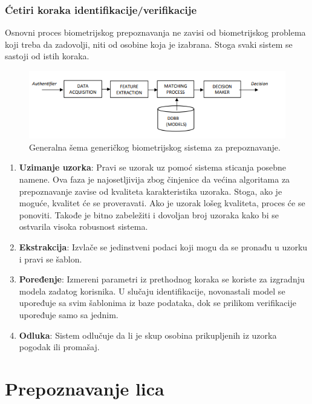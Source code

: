 \documentclass[11pt, a4paper]{article}
\begin{document}
\subsubsection{Ćetiri koraka identifikacije/verifikacije}

Osnovni proces biometrijskog prepoznavanja ne zavisi od biometrijskog problema koji treba da zadovolji, niti od osobine koja je izabrana. Stoga svaki sistem se sastoji od istih koraka.

\begin{figure}[h!]
	\centerline{\includegraphics[]{recognition_scheme.png}}
	\caption{Generalna šema generičkog biometrijskog sistema za prepoznavanje.}
	\label{fig:scheme}
\end{figure}

\begin{enumerate}
    \item \textbf{Uzimanje uzorka}: Pravi se uzorak uz pomoć sistema sticanja posebne namene. Ova faza je najosetljivija zbog činjenice da većina algoritama za prepoznavanje zavise od kvaliteta karakteristika uzoraka. Stoga, ako je moguće, kvalitet će se proveravati. Ako je uzorak lošeg kvaliteta, proces će se ponoviti. Takođe je bitno zabeležiti i dovoljan broj uzoraka kako bi se ostvarila visoka robusnost sistema.
    \item \textbf{Ekstrakcija}: Izvlače se jedinstveni podaci koji mogu da se pronađu u uzorku i pravi se šablon.
    \item \textbf{Poređenje}: Izmereni parametri iz prethodnog koraka se koriste za izgradnju modela zadatog korisnika. U slučaju identifikacije, novonastali model se upoređuje sa svim šablonima iz baze podataka, dok se prilikom verifikacije upoređuje samo sa jednim.
    \item \textbf{Odluka}: Sistem odlučuje da li je skup osobina prikupljenih iz uzorka pogodak ili promašaj.
    
    
    
\end{enumerate}

\newpage

\section{Prepoznavanje lica}
\end{document}
